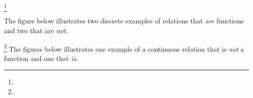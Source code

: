 \begin{definition}
\footnote{
  }
\label{def:arity}
\end{definition}

\begin{example}
\label{ex:rel_f_disc}
The figure below illustrates two discrete examples of relations that \emph{are} functions
and two that are \emph{not}.

\begin{center}
  
\end{center}
\end{example}

\begin{example}
\label{ex:rel_f_cont}
\footnote{
  }
The figures below illustrates one example of a continuous relation that is \emph{not} a function
and one that \emph{is}.
\\
  \begin{center}
  {%
  }
  \end{center}
\end{example}

